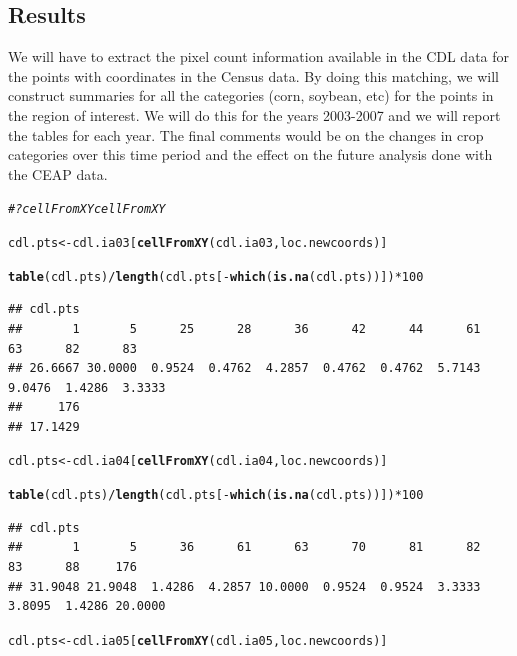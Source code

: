\documentclass{article}\usepackage[]{graphicx}\usepackage[]{color}
\makeatletter
\newcommand{\hlnum}[1]{\textcolor[rgb]{0.686,0.059,0.569}{#1}}%
\newcommand{\hlcom}[1]{\textcolor[rgb]{0.678,0.584,0.686}{\textit{#1}}}%
\newcommand{\hlopt}[1]{\textcolor[rgb]{0,0,0}{#1}}%
\newcommand{\hlstd}[1]{\textcolor[rgb]{0.345,0.345,0.345}{#1}}%
\newcommand{\hlkwb}[1]{\textcolor[rgb]{0.69,0.353,0.396}{#1}}%
\newcommand{\hlkwd}[1]{\textcolor[rgb]{0.737,0.353,0.396}{\textbf{#1}}}%
\newenvironment{kframe}{%
 \def\at@end@of@kframe{}%
 \ifinner\ifhmode%
  \def\at@end@of@kframe{\end{minipage}}%
  \begin{minipage}{\columnwidth}%
 \fi\fi%
 \def\FrameCommand##1{\hskip\@totalleftmargin \hskip-\fboxsep
 \colorbox{shadecolor}{##1}\hskip-\fboxsep
     \hskip-\linewidth \hskip-\@totalleftmargin \hskip\columnwidth}%
 \MakeFramed {\advance\hsize-\width
   \@totalleftmargin\z@ \linewidth\hsize
   \@setminipage}}%
 {\par\unskip\endMakeFramed%
 \at@end@of@kframe}
\newenvironment{knitrout}{}{} %
\makeatother
\begin{document}
\begin{itemize}
\begin{knitrout}
\end{knitrout}


\section{Results}

We will have to extract the pixel count information available in the CDL data for the points with coordinates in the Census data. By doing this matching, we will construct summaries for all the categories (corn, soybean, etc) for the points in the region of interest. We will do this for the years 2003-2007 and we will report the tables for each year. The final comments would be on the changes in crop categories over this time period and the effect on the future analysis done with the CEAP data. 

\begin{knitrout}
\color{fgcolor}\begin{kframe}
\begin{alltt}
\hlcom{# ?cellFromXY cellFromXY}

\hlstd{cdl.pts} \hlkwb{<-} \hlstd{cdl.ia03[}\hlkwd{cellFromXY}\hlstd{(cdl.ia03, loc.newcoords)]}
\end{alltt}


{\ttfamily\noindent\color{warningcolor}{\#\# Warning: some indices are invalid (NA returned)}}\begin{alltt}
\hlkwd{table}\hlstd{(cdl.pts)}\hlopt{/}\hlkwd{length}\hlstd{(cdl.pts[}\hlopt{-}\hlkwd{which}\hlstd{(}\hlkwd{is.na}\hlstd{(cdl.pts))])} \hlopt{*} \hlnum{100}
\end{alltt}
\begin{verbatim}
## cdl.pts
##       1       5      25      28      36      42      44      61      63      82      83 
## 26.6667 30.0000  0.9524  0.4762  4.2857  0.4762  0.4762  5.7143  9.0476  1.4286  3.3333 
##     176 
## 17.1429
\end{verbatim}
\begin{alltt}
\hlstd{cdl.pts} \hlkwb{<-} \hlstd{cdl.ia04[}\hlkwd{cellFromXY}\hlstd{(cdl.ia04, loc.newcoords)]}
\end{alltt}


{\ttfamily\noindent\color{warningcolor}{\#\# Warning: some indices are invalid (NA returned)}}\begin{alltt}
\hlkwd{table}\hlstd{(cdl.pts)}\hlopt{/}\hlkwd{length}\hlstd{(cdl.pts[}\hlopt{-}\hlkwd{which}\hlstd{(}\hlkwd{is.na}\hlstd{(cdl.pts))])} \hlopt{*} \hlnum{100}
\end{alltt}
\begin{verbatim}
## cdl.pts
##       1       5      36      61      63      70      81      82      83      88     176 
## 31.9048 21.9048  1.4286  4.2857 10.0000  0.9524  0.9524  3.3333  3.8095  1.4286 20.0000
\end{verbatim}
\begin{alltt}
\hlstd{cdl.pts} \hlkwb{<-} \hlstd{cdl.ia05[}\hlkwd{cellFromXY}\hlstd{(cdl.ia05, loc.newcoords)]}
\end{alltt}



\end{kframe}
\end{knitrout}
\end{itemize}
\end{document}
